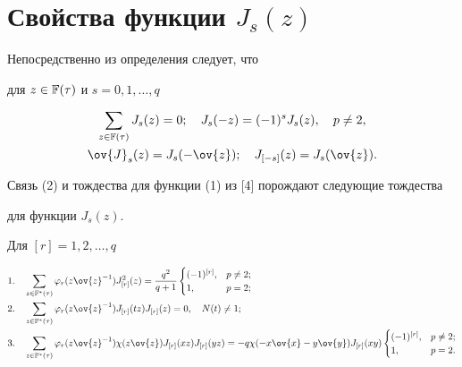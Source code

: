 \section{Свойства функции $J_s(z)$}





Непосредственно из определения следует, что


для $z\in{\Bbb F(\tau)}$ и $ s=0,1,\dotsc,q$


\begin{gather*}


\sum_{z\in{\Bbb F(\tau)}}{J_s(z)}=0;\quad


J_s(-z)=(-1)^sJ_s(z), \quad p\neq2,\\


\ov{J}_s(z)=J_s(-\ov{z}); \quad


J_{[-s]}(z)=J_s(\ov{z}).


\end{gather*} 





Связь (2) и тождества для функции (1) из [4] порождают следующие тождества


для функции $J_s(z)$.





\begin{props}


Для $[r]=1,2,\dotsc,q$


\begin{align*}


&1. \quad \sum_{z\in{\Bbb F^*(\tau)}}{\varphi_r(z\ov{z}^{-1})J_{[r]}^2(z)}=


\frac{q^2}{q+1}


\begin{cases} (-1)^{[r]}, & p\neq2;\\ 1, & p=2;\end{cases} \\


%


&2.\quad \sum_{z\in{\Bbb F^*(\tau)}}{\varphi_r(z\ov{z}^{-1})J_{[r]}(tz)


J_{[r]}(z)}=0,\quad N(t)\neq1;\\


%


&3.\quad \sum_{z\in{\Bbb F^*(\tau)}}{\varphi_r(z\ov{z}^{-1}){\chi(z\ov{z})}


J_{[r]}(xz)J_{[r]}(yz)}


=-q\chi(-x\ov{x}-y\ov{y})J_{[r]}(xy)


\begin{cases} (-1)^{[r]}, & p\neq2;\\ 1, & p=2.\end{cases}


\end{align*}


\end{props}





